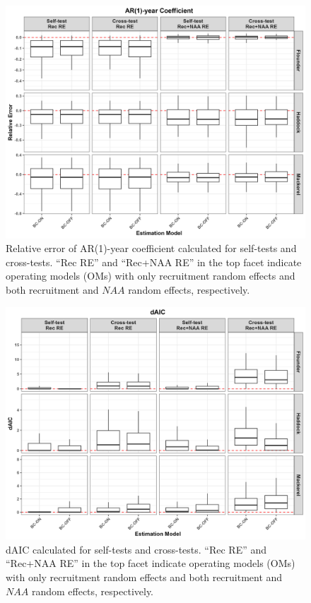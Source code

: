\documentclass[
  12pt,
]{article}
\begin{document}
\begin{figure}[H]
\centering
\includegraphics[width=\textwidth]{Revised_Figures&Tables/Rho.PNG}
\caption{Relative error of AR(1)-year coefficient calculated for self-tests and cross-tests. ``Rec RE'' and ``Rec+NAA RE'' in the top facet indicate operating models (OMs) with only recruitment random effects and both recruitment and $NAA$ random effects, respectively.}
\label{fig:supp_ar1}
\end{figure}

\begin{figure}[H]
    \centering
    \includegraphics[width=\textwidth]{Revised_Figures&Tables/dAIC.PNG}
    \caption{dAIC calculated for self-tests and cross-tests. ``Rec RE'' and ``Rec+NAA RE'' in the top facet indicate operating models (OMs) with only recruitment random effects and both recruitment and $NAA$ random effects, respectively.}
    \label{fig:supp_dAIC}
\end{figure}
\end{document}
